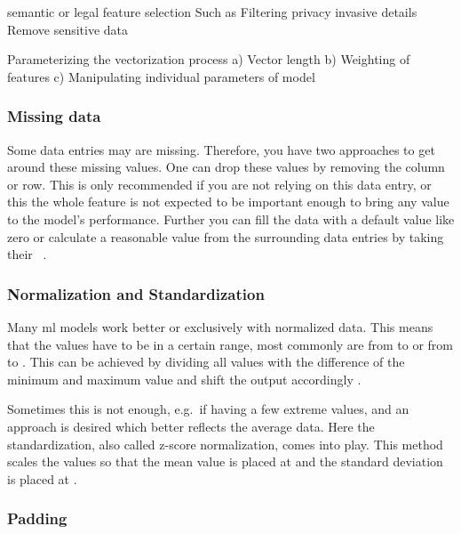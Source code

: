 semantic or legal feature selection
Such as Filtering privacy invasive details
Remove sensitive data

Parameterizing the vectorization process
a) Vector length
b) Weighting of features
c) Manipulating individual parameters of model

\subsubsection{Missing data}
Some data entries may are missing.
Therefore, you have two approaches to get around these missing values.
One can drop these values by removing the column or row.
This is only recommended if you are not relying on this data entry, or this the whole feature is not expected to be important enough to bring any value to the model's performance.
Further you can fill the data with a default value like zero or calculate a reasonable value from the surrounding data entries by taking their ~\cite{duong2021}.

\subsubsection{Normalization and Standardization}

Many \gls{ml} models work better or exclusively with normalized data.
This means that the values have to be in a certain range, most commonly are from  to  or from  to .
This can be achieved by dividing all values with the difference of the minimum and maximum value and shift the output accordingly \cite{duong2021}.


Sometimes this is not enough, e.g.\ if having a few extreme values, and an approach is desired which better reflects the average data.
Here the standardization, also called z-score normalization, comes into play.
This method scales the values so that the mean value is placed at  and the standard deviation is placed at .

\subsubsection{Padding}
\label{subsubsec:padding}

